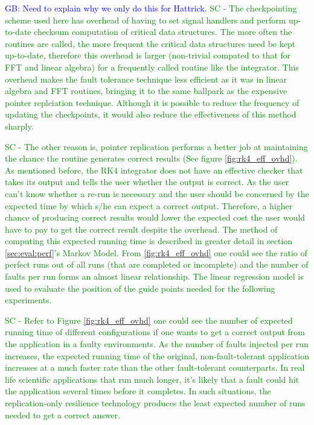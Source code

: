 \documentclass{sig-alternate}
\newcommand{\sui}[1]{%
  \textcolor{green}{SC - #1}
}
\newcommand{\greg}[1]{%
  \textcolor{blue}{GB: #1}
}
\begin{document}
\greg{Need to explain why we only do this for Hattrick.} \sui{The checkpointing scheme used here has overhead of having to set signal handlers and perform up-to-date checksum computation of critical data structures. The more often the routines are called, the more frequent the critical data structures need be kept up-to-date, therefore this overhead is larger (non-trivial compated to that for FFT and linear algebra) for a frequently called routine like the integrator. This overhead makes the fault tolerance technique less efficient as it was in linear algebra and FFT routines, bringing it to the same ballpark as the expensive pointer replciation technique. Although it is possible to reduce the frequency of updating the checkpoints, it would also reduce the effectiveness of this method sharply.}

\sui{
The other reason is, pointer replication performs a better job at maintaining the chance the routine generates correct results (See figure \ref{fig:rk4_eff_ovhd}). As mentioned before, the RK4 integrator does not have an effective checker that takes its output and tells the user whether the output is correct. As the user can't know whether a re-run is necessary and the user should be concerned by the expected time by which s/he can expect a correct output. Therefore, a higher chance of producing correct results would lower the expected cost the user would have to pay to get the correct result despite the overhead. The method of computing this expected running time is described in greater detail in section \ref{sec:eval:perf}'s Markov Model. From \ref{fig:rk4_eff_ovhd} one could see the ratio of perfect runs out of all runs (that are completed or incomplete) and the number of faults per run forms an almost linear relationship. The linear regression model is used to evaluate the position of the guide points needed for the following experiments.
} 

\sui{Refer to Figure \ref{fig:rk4_eff_ovhd} one could see the number of expected running time of different configurations if one wants to get a correct output from the application in a faulty environments. As the number of faults injected per run increases, the expected running time of the original, non-fault-tolerant application increases at a much faster rate than the other fault-tolerant counterparts. In real life scientific applications that run much longer, it's likely that a fault could hit the application several times before it completes. In such situations, the replication-only resilience technology produces the least expected number of runs needed to get a correct answer.}
\end{document}

